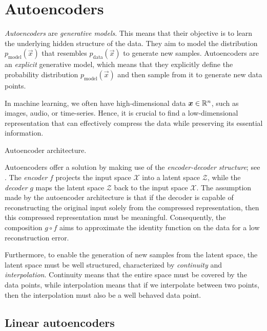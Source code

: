 \section{Autoencoders}

\textit{Autoencoders} are \textit{generative models}. This means that their objective is to learn
the underlying hidden structure of the data. They aim to model the distribution
$p_{\mathrm{model}}(\vec{x})$ that resembles $p_{\mathrm{data}}(\vec{x})$ to generate new samples.
Autoencoders are an \textit{explicit} generative model, which means that they explicitly define the
probability distribution $p_{\mathrm{model}}(\vec{x})$ and then sample from it to generate new data
points.

In machine learning, we often have high-dimensional data $\bm{x} \in \mathbb{R}^n$, such as images, audio,
or time-series. Hence, it is crucial to find a low-dimensional representation that can effectively
compress the data while preserving its essential information.

\begin{marginfigure}
    \centering
    \caption{Autoencoder architecture.}
    \label{fig:autoencoder}
\end{marginfigure}

Autoencoders offer a solution by making use of the \textit{encoder-decoder structure}; see
. The \textit{encoder} $f$ projects the input space $\mathcal{X}$ into a
latent space $\mathcal{Z}$, while the \textit{decoder} $g$ maps the latent space $\mathcal{Z}$ back
to the input space $\mathcal{X}$. The assumption made by the autoencoder architecture is that if
the decoder is capable of reconstructing the original input solely from the compressed
representation, then this compressed representation must be meaningful. Consequently, the
composition $g \circ f$ aims to approximate the identity function on the data for a low
reconstruction error.

Furthermore, to enable the generation of new samples from the latent space, the latent space must
be well structured, characterized by \textit{continuity} and \textit{interpolation}. Continuity
means that the entire space must be covered by the data points, while interpolation means that if
we interpolate between two points, then the interpolation must also be a well behaved data point.

\subsection{Linear autoencoders}

